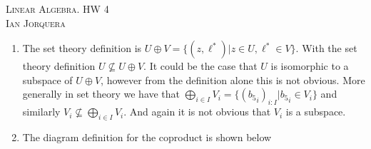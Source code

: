 \documentclass[12pt]{amsart}
\theoremstyle{definition}
\begin{document}
\begin{center}
    \textsc{Linear Algebra. HW 4\\ Ian Jorquera}
\end{center}
\vspace{1em}

\begin{enumerate}
    \item The set theory definition is $U\oplus V= \{(z,\ell^*)|z\in U, \ell^*\in V\}$. With the set theory definition $U\not\subseteq U\oplus V$. It could be the case that $U$ is isomorphic to a subspace of $U\oplus V$, however from the definition alone this is not obvious.
    More generally in set theory we have that
    $\bigoplus_{i\in I}V_i=\{({b_5}_i)_{i:I}| {b_5}_i\in V_i\}$ and similarly $V_i\not\subseteq \bigoplus_{i\in I}V_i$. And again it is not obvious that $V_i$ is a subspace. \\

    \item The diagram definition for the coproduct is shown below


\end{enumerate}
\end{document}
